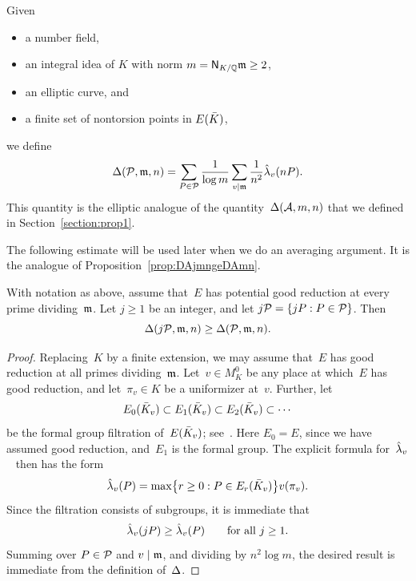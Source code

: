 \documentclass[12pt,reqno]{amsart}
\begin{document}
\begin{definition}
Given
\begin{itemize}
\item[$K/\QQ$]
a number field,
\item[$\gm$]
an integral idea of $K$ with norm $m={\operatorname{\mathsf{N}}}_{K/\mathbb{Q}}{\mathfrak{m}}\ge2$,
\item[$E/K$]
an elliptic curve, and
\item[$\Pcal$]
a finite set of nontorsion points in $E({\bar K})$,
\end{itemize}
we define
\[
  \Delta({\mathcal P},{\mathfrak{m}},n) =
  \sum_{P\in{\mathcal P}} \frac{1}{\log m}\sum_{v\mid{\mathfrak{m}}} \frac{1}{n^2} \hat\lambda_v(nP).
\]
This quantity is the elliptic analogue of the quantity~$\Delta({\mathcal A},m,n)$
that we defined in Section~\ref{section:prop1}.
\end{definition}

The following estimate will be used later when we do an averaging
argument. It is the analogue of Proposition~\ref{prop:DAjmngeDAmn}.

\begin{lemma}
\label{lemma:DjPgeDP}
With notation as above, assume that~$E$ has potential good reduction
at every prime dividing~$\gm$.  Let $j\ge1$ be an integer, and let
$j{\mathcal P}=\{jP:P\in{\mathcal P}\}$. Then
\[
  \Delta(j{\mathcal P},{\mathfrak{m}},n)\ge \Delta({\mathcal P},{\mathfrak{m}}, n).
\]
\end{lemma}
\begin{proof}
Replacing~$K$ by a finite extension, we may assume that~$E$ has good
reduction at all primes dividing~$\gm$.  Let~$v\in M_K^0$ be any place
at which~$E$ has good reduction, and let~$\pi_v\in K$ be a uniformizer
at~$v$. Further, let
\[
  E_0({\bar K}_v) \subset E_1({\bar K}_v) \subset E_2({\bar K}_v) \subset \cdots
\]
be the formal group filtration of~$E({\bar K}_v)$;
see~\cite[Chapters~IV,~VII]{MR2514094}. Here $E_0=E$, since we have assumed
good reduction, and~$E_1$ is the formal group.  The explicit formula
for~$\hat\lambda_v$~\cite[Theorem~VI.4.1]{ATAEC} then has the form
\[
  \hat\lambda_v(P) = \max\bigl\{r\ge0 : P \in E_r({\bar K}_v)\bigr\}v(\pi_v).
\]
Since the filtration consists of subgroups, it is immediate that
\[
  \hat\lambda_v(jP) \ge \hat\lambda_v(P)
  \qquad\text{for all $j\ge1$.}
\]
Summing over $P\in{\mathcal P}$ and $v\mid{\mathfrak{m}}$, and dividing by $n^2\log m$,
the desired result is immediate from the definition of~$\Delta$.  
\end{proof}
\end{document}
